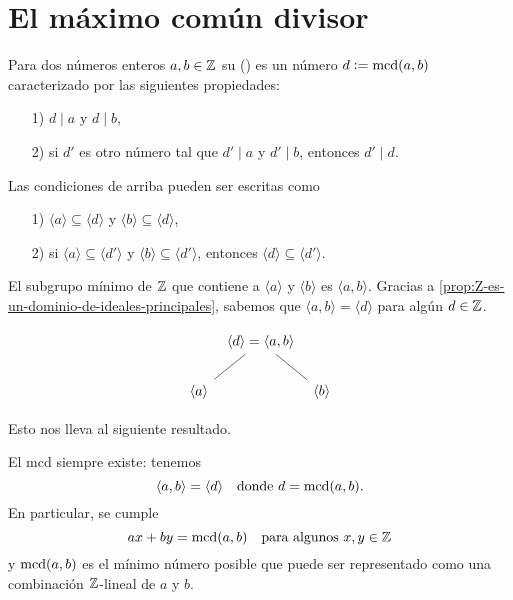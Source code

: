 \documentclass{article}
\numberwithin{equation}{section}
\begin{document}
\section{El máximo común divisor}

\begin{definicion}
  \label{dfn:maximo-comun-divisor}
  Para dos números enteros $a,b\in \mathbb{Z}$ su  () es un
  número $d \mathrel{\mathop:}= \operatorname{mcd} (a,b)$ caracterizado por las siguientes propiedades:

  \begin{enumerate}
  \item[1)] $d \mid a$ y $d\mid b$,

  \item[2)] si $d'$ es otro número tal que $d' \mid a$ y $d' \mid b$, entonces
    $d' \mid d$.
  \end{enumerate}
\end{definicion}

Las condiciones de arriba pueden ser escritas como

\begin{enumerate}
\item[1)] $\langle a\rangle \subseteq \langle d\rangle$ y $\langle b\rangle \subseteq \langle d\rangle$,

\item[2)] si $\langle a\rangle \subseteq \langle d'\rangle$ y
  $\langle b\rangle \subseteq \langle d'\rangle$, entonces
  $\langle d\rangle \subseteq \langle d'\rangle$.
\end{enumerate}

El subgrupo mínimo de $\mathbb{Z}$ que contiene a $\langle a\rangle$ y
$\langle b\rangle$ es $\langle a,b\rangle$. Gracias a
\ref{prop:Z-es-un-dominio-de-ideales-principales}, sabemos que
$\langle a,b\rangle = \langle d\rangle$ para algún $d\in \mathbb{Z}$.

\[ \begin{tikzcd}[column sep=0.5em]
    & \langle d\rangle = \langle a,b\rangle\ar[-]{dl}\ar[-]{dr} \\
    \langle a\rangle & & \langle b\rangle
  \end{tikzcd} \]

Esto nos lleva al siguiente resultado.

\begin{proposicion}
  El mcd siempre existe: tenemos
  $$\langle a,b\rangle = \langle d\rangle \quad\text{donde } d = \operatorname{mcd} (a,b).$$
  En particular, se cumple
  $$ax + by = \operatorname{mcd} (a,b)\quad\text{para algunos }x,y\in\mathbb{Z}$$
  y $\operatorname{mcd} (a,b)$ es el mínimo número posible que puede ser representado como una
  combinación $\mathbb{Z}$-lineal de $a$ y $b$.
\end{proposicion}
\end{document}
